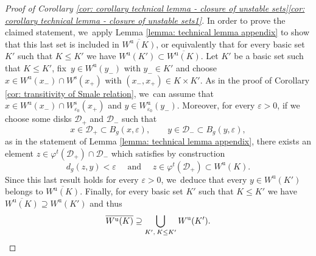 \documentclass[JEP,XML,SOM,Unicode,NoEqCountersInSection,NoFloatCountersInSection,published]{cedram}
\newcommand{\rs}{\mathrm{s}}
\newcommand{\ru}{\mathrm{u}}
\theoremstyle{definition}
\theoremstyle{plain}
\newcommand{\D}{\mathcal{D}}
\begin{document}
\begin{appendix}
\begin{proof}[Proof of Corollary \ref{cor: corollary technical lemma - closure of unstable sets}\eqref{cor: corollary technical lemma - closure of unstable sets1}]
In order to prove the claimed statement, we~apply Lemma \ref{lemma: technical lemma appendix} to show that this last set is included in $\overline{W^\ru (K)}$, or equivalently that for every basic set $K'$ such that $K \leq K'$ we have $W^\ru (K') \subset \overline{W^\ru (K)}$. Let $K'$ be a basic set such that $K \leq K'$, fix~$y \in W^\ru (y_-)$ with $y_- \in K'$ and choose $x \in W^\ru (x_-) \cap W^\rs (x_+)$ with $(x_-, x_+) \in K \times K'$. As in the proof of Corollary \ref{cor: transitivity of Smale relation}, we~can assume that $x \in W^\ru (x_-) \cap W_{\varepsilon_0}^\rs (x_+)$ and $y \in W_{\varepsilon_0}^\ru (y_-)$. Moreover, for every $\varepsilon > 0$, if we choose some disks $\D_+$ and $\D_-$ such that
\[
x \in \D_+ \subset B_g (x, \varepsilon), \qquad y \in \D_- \subset B_g (y, \varepsilon),
\]
as in the statement of Lemma \ref{lemma: technical lemma appendix}, there exists an element $z \in \varphi^t (\D_{+}) \cap \D_{-}$ which satisfies by construction
\[
d_g \left(z, y \right) < \varepsilon \quad\text{ and }\quad z \in \varphi^t (\D_{+}) \subset W^\ru (K).
\]
Since this last result holds for every $\varepsilon > 0$, we~deduce that every $y \in W^\ru (K')$ belongs to $\overline{W^\ru (K)}$. Finally, for every basic set $K'$ such that $K\leq K'$ we have $\overline{W^\ru (K)} \supseteq W^\ru (K')$ and thus
\[
\overline{W^\ru (K)} \supseteq \bigcup_{K', \: K \leq K'} W^\ru (K').\qedhere
\]
\end{proof}


\end{appendix}
\end{document}

